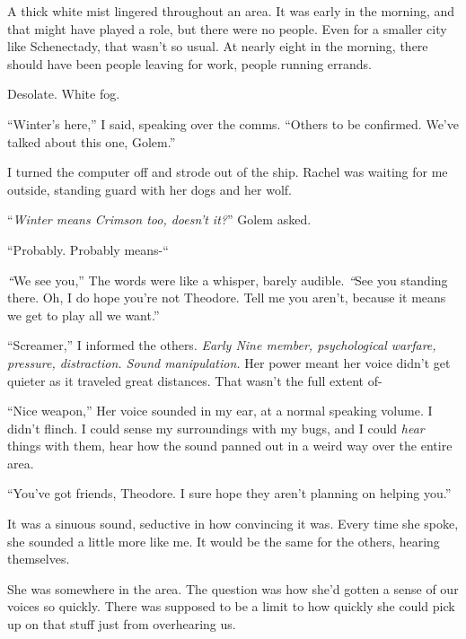 A thick white mist lingered throughout an area.  It was early in the morning, and that might have played a role, but there were no people.  Even for a smaller city like Schenectady, that wasn't so usual.  At nearly eight in the morning, there should have been people leaving for work, people running errands.



Desolate.  White fog.



``Winter's here,'' I said, speaking over the comms.  ``Others to be confirmed.  We've talked about this one, Golem.''



I turned the computer off and strode out of the ship.  Rachel was waiting for me outside, standing guard with her dogs and her wolf.



``\emph{Winter means Crimson too, doesn't it?}'' Golem asked.



``Probably.  Probably means-``



\emph{``}We see you,'' The words were like a whisper, barely audible.  \emph{``}See you standing there.  Oh, I do hope you're not Theodore.  Tell me you aren't, because it means we get to play all we want.''



``Screamer,'' I informed the others.  \emph{Early Nine member, psychological warfare, pressure, distraction.  Sound manipulation.}  Her power meant her voice didn't get quieter as it traveled great distances.  That wasn't the full extent of-



``Nice weapon,''  Her voice sounded in my ear, at a normal speaking volume.  I didn't flinch.  I could sense my surroundings with my bugs, and I could \emph{hear} things with them, hear how the sound panned out in a weird way over the entire area.



``You've got friends, Theodore.  I sure hope they aren't planning on helping you.''



It was a sinuous sound, seductive in how convincing it was.  Every time she spoke, she sounded a little more like me.  It would be the same for the others, hearing themselves.



She was somewhere in the area.  The question was how she'd gotten a sense of our voices so quickly.  There was supposed to be a limit to how quickly she could pick up on that stuff just from overhearing us.



